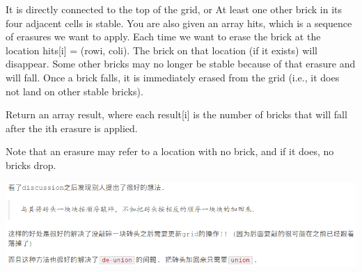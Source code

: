 \documentclass[9pt, b5paaper]{book}
\begin{document}
It is directly connected to the top of the grid, or
At least one other brick in its four adjacent cells is stable.
You are also given an array hits, which is a sequence of erasures we want to apply. Each time we want to erase the brick at the location hits[i] = (rowi, coli). The brick on that location (if it exists) will disappear. Some other bricks may no longer be stable because of that erasure and will fall. Once a brick falls, it is immediately erased from the grid (i.e., it does not land on other stable bricks).

Return an array result, where each result[i] is the number of bricks that will fall after the ith erasure is applied.

Note that an erasure may refer to a location with no brick, and if it does, no bricks drop.

\includegraphics[width=.9\linewidth]{./pic/hitBricks.png}
\end{document}
